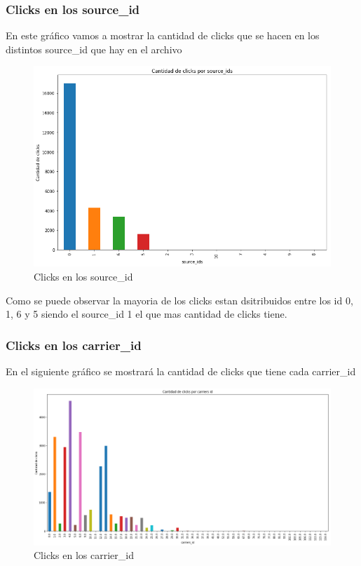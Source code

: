 \documentclass[a4paper, 12pt]{article}
\newcommand\tab[1][1cm]{\hspace*{#1}}
\begin{document}
	\subsubsection{Clicks en los source_id}
		\tab En este gráfico vamos a mostrar la cantidad de clicks que se hacen en los distintos source_id que hay en el archivo
		
		
		\FloatBarrier
		\begin{figure}[h]
			\centering
			\includegraphics[width=\textwidth]{images/clicks/clicks_source_id.png}
			\caption{Clicks en los source_id}
		\end{figure}
		\FloatBarrier

		\tab Como se puede observar la mayoria de los clicks estan dsitribuidos entre los id 0, 1, 6 y 5 siendo el source_id 1 el que mas cantidad de clicks tiene.


	\subsubsection{Clicks en los carrier_id}
		\tab En el siguiente gráfico se mostrará la cantidad de clicks que tiene cada carrier_id
		
		\FloatBarrier
		\begin{figure}[h]
			\centering
			\includegraphics[width=\textwidth]{images/clicks/clicks_carrier_id.png}
			\caption{Clicks en los carrier_id}
		\end{figure}
		\FloatBarrier
\end{document}
